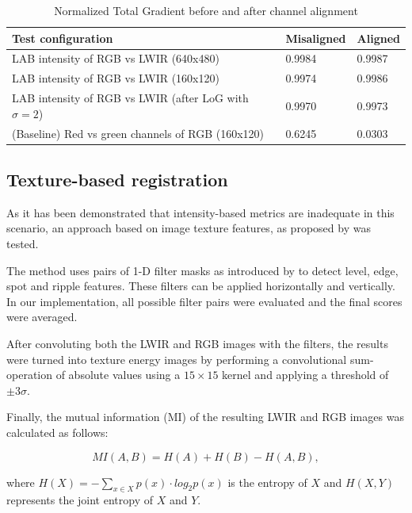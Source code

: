 \documentclass{l4proj}
\begin{document}
\begin{table}[]
  \centering
  \begin{tabular}{@{}lll@{}}
  \toprule
  \textbf{Test configuration}                             & \textbf{Misaligned} & \textbf{Aligned} \\ \midrule
  LAB intensity of RGB vs LWIR (640x480)     & 0.9984              & 0.9987           \\
  LAB intensity of RGB vs LWIR (160x120)    & 0.9974              & 0.9986           \\
  LAB intensity of RGB vs LWIR (after LoG with $\sigma=2$) & 0.9970              & 0.9973           \\
  (Baseline) Red vs green channels of RGB (160x120)                  & 0.6245              & 0.0303           \\ \bottomrule
  \end{tabular}
  \caption{Normalized Total Gradient before and after channel alignment}
  \label{table:registration_ntg}
\end{table}


\subsection{Texture-based registration}

As it has been demonstrated that intensity-based metrics are inadequate in this scenario, an approach based on image texture features, as proposed by \citet{jarc_graz_nodate} was tested. 

The method uses pairs of 1-D filter masks as introduced by \citet{laws_rapid_1980} to detect level, edge, spot and ripple features. These filters can be applied horizontally and vertically. In our implementation, all possible filter pairs were evaluated and the final scores were averaged.

After convoluting both the LWIR and RGB images with the filters, the results were turned into texture energy images by performing a convolutional sum-operation of absolute values using a $15 \times 15$ kernel and applying a threshold of $\pm 3 \sigma$. 

Finally, the mutual information (MI) of the resulting LWIR and RGB images was calculated as follows:

\begin{equation}
  MI(A,B) = H(A) + H(B) - H(A,B),
\end{equation}

where $H(X) = - \sum_{x \in X} p(x) \cdot log_2 p(x)$ is the entropy of $X$ and $H(X,Y)$ represents the joint entropy of $X$ and $Y$.
\end{document}
